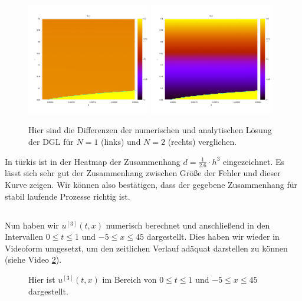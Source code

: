 \documentclass[ngerman]{scrartcl}
\begin{document}
\begin{figure}[htbp]
	\centering
	\includegraphics[width=0.48\textwidth]{heatMapN1}
	\includegraphics[width=0.48\textwidth]{heatMapN2}
	\caption[Vergleich]{Hier sind die Differenzen der numerischen und analytischen Lösung der DGL für $N=1$ (links) und $N=2$ (rechts) verglichen.}
	\label{fig:H10.2}
\end{figure}


In türkis ist in der Heatmap der Zusammenhang $ d= \frac{1}{2.6} \cdot h^3$ eingezeichnet. Es lässt sich sehr gut der Zusammenhang zwischen Größe der Fehler und dieser Kurve zeigen. Wir können also bestätigen, dass der gegebene Zusammenhang für stabil laufende Prozesse richtig ist.



\subsection{}

Nun haben wir $u^{[3]}(t, x)$ numerisch berechnet und anschließend in den Intervallen $ 0 \le t \le 1$ und $-5 \le x \le 45$ dargestellt. Dies haben wir wieder in Videoform umgesetzt, um den zeitlichen Verlauf adäquat darstellen zu können (siehe Video \ref{vid:H10.3}). 

\begin{figure}[htbp]
	\centering
	\caption[]{Hier ist $u^{[3]}(t, x)$ im Bereich von $0\le t \le 1$ und $-5 \le x \le 45$ dargestellt.}
	\label{vid:H10.3}
\end{figure}
\end{document}
